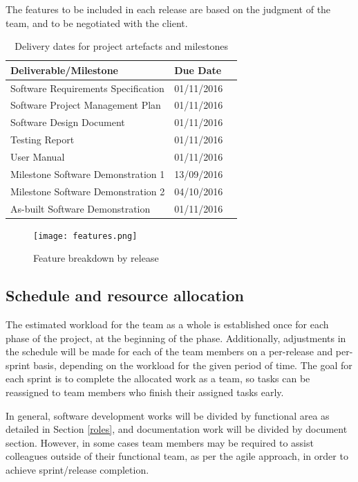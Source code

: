 \documentclass[12pt]{article}
\begin{document}
The features to be included in each release are based on the judgment of the team, and to be negotiated with the client.

\begin{table}
\begin{tabular}{ | p{} | p{} |p{}|}
\hline
\textbf{Deliverable/Milestone } & \textbf{Due Date} \\
\hline
Software Requirements Specification & 01/11/2016  \\
\hline
Software Project Management Plan &  01/11/2016   \\
\hline
Software Design Document &  01/11/2016  \\
\hline
Testing Report &  01/11/2016  \\
\hline
User Manual &  01/11/2016  \\
\hline
Milestone Software Demonstration 1 &  13/09/2016  \\
\hline
Milestone Software Demonstration 2 &  04/10/2016  \\
\hline
As-built Software Demonstration &  01/11/2016  \\
\hline
\end{tabular}
\caption{Delivery dates for project artefacts and milestones}
\label{table:milestones}
\end{table}

\begin{figure}[htp!]
\centering\texttt{[image: features.png]}
\caption{Feature breakdown by release}
  \label{fig:features}
\end{figure}

\subsection{Schedule and resource allocation }
The estimated workload for the team as a whole is established once  for each phase of the project, at the beginning of the phase. Additionally, adjustments in the schedule will be made for each of the team members on a per-release and per-sprint basis, depending on the workload for the given period of time. The goal for each sprint is to complete the allocated work as a team, so tasks can be reassigned to team members who finish their assigned tasks early.

In general, software development works will be divided by functional area as detailed in Section \ref{roles}, and documentation work will be divided by document section. However, in some cases team members may be required to assist colleagues outside of their functional team, as per the agile approach, in order to achieve sprint/release completion.
\end{document}
